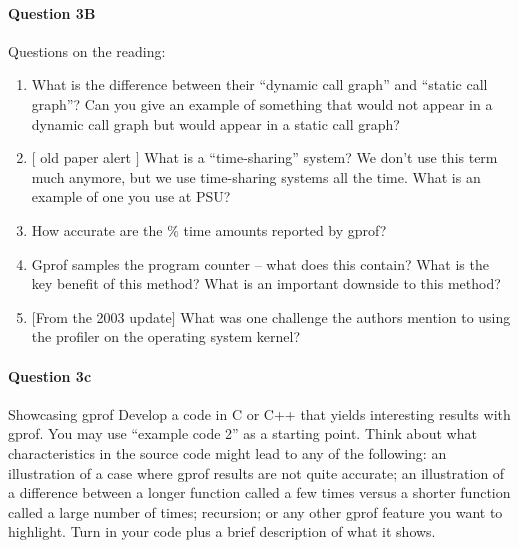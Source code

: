 \documentclass[11pt]{article}
\begin{document}
\paragraph{Question 3B} Questions on the reading:\\
\begin{enumerate}
\item What is the difference between their “dynamic call graph” and “static call graph”? Can you give
an example of something that would not appear in a dynamic call graph but would appear in a static call graph?
\item $[$ old paper alert $]$ What is a “time-sharing” system? We don’t use this term much anymore, but we use time-sharing systems all the time. What is an example of one you use at PSU?
\item How accurate are the $\%$ time amounts reported by gprof?
\item Gprof samples the program counter – what does this contain? What is the key benefit of this method? What is an important downside to this method?
\item $[$From the 2003 update$]$ What was one challenge the authors mention to using the profiler on the operating system kernel?
\end{enumerate}



\paragraph{Question 3c} Showcasing gprof
Develop a code in C or C++ that yields interesting results with gprof. You may use “example code 2” as a starting point. Think about what characteristics in the source code might lead to any of the following: an illustration of a case where gprof results are not quite accurate; an illustration of a difference between a longer function called a few times versus a shorter function called a large number of times; recursion; or any other gprof feature you want to highlight.
Turn in your code plus a brief description of what it shows.
\end{document}
